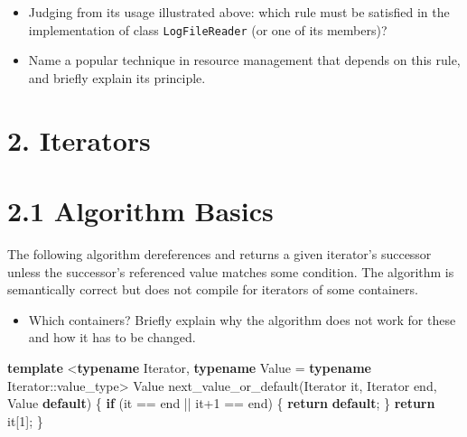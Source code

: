 \documentclass[]{article}
\newenvironment{Shaded}{}{}
\newcommand{\KeywordTok}[1]{\textcolor[rgb]{0.00,0.44,0.13}{\textbf{{#1}}}}
\newcommand{\DecValTok}[1]{\textcolor[rgb]{0.25,0.63,0.44}{{#1}}}
\newcommand{\NormalTok}[1]{{#1}}
\providecommand{\tightlist}{%
  \setlength{\itemsep}{0pt}\setlength{\parskip}{0pt}}
\begin{document}
\begin{itemize}
\tightlist
\item
  Judging from its usage illustrated above: which rule must be satisfied
  in the implementation of class \texttt{LogFileReader} (or one of its
  members)?
\item
  Name a popular technique in resource management that depends on this
  rule, and briefly explain its principle.
\end{itemize}

\section{2. Iterators}\label{iterators}

\section{2.1 Algorithm Basics}\label{algorithm-basics}

The following algorithm dereferences and returns a given iterator's
successor unless the successor's referenced value matches some
condition. The algorithm is semantically correct but does not compile
for iterators of some containers.

\begin{itemize}
\tightlist
\item
  Which containers? Briefly explain why the algorithm does not work for
  these and how it has to be changed.
\end{itemize}

\begin{Shaded}
\begin{Highlighting}[]
\KeywordTok{template} \NormalTok{<}\KeywordTok{typename} \NormalTok{Iterator, }\KeywordTok{typename} \NormalTok{Value = }\KeywordTok{typename} \NormalTok{Iterator::value_type>}
\NormalTok{Value next_value_or_default(Iterator it, Iterator end, Value }\KeywordTok{default}\NormalTok{) \{}
  \KeywordTok{if} \NormalTok{(it == end || it}\DecValTok{+1} \NormalTok{== end) \{ }\KeywordTok{return} \KeywordTok{default}\NormalTok{; \}}
  \KeywordTok{return} \NormalTok{it[}\DecValTok{1}\NormalTok{];}
\NormalTok{\}}
\end{Highlighting}
\end{Shaded}
\end{document}
